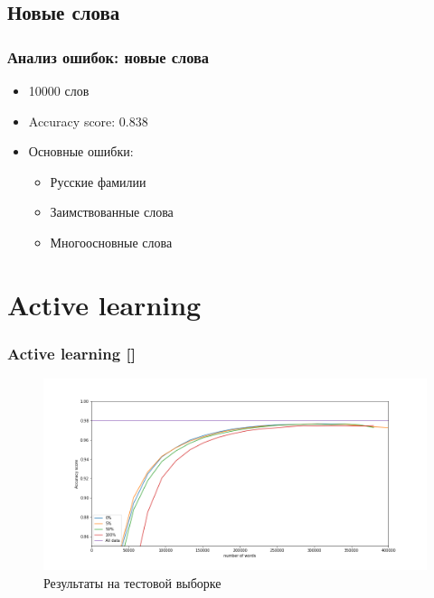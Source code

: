 \documentclass[russian]{beamer}
\begin{document}
\subsection{Новые слова}
\begin{frame}
\frametitle{Анализ ошибок: новые слова}
\begin{itemize}
	\item 10000 слов
	\item Accuracy score: 0.838
	\item Основные ошибки:
	\begin{itemize}
		\item Русские фамилии
		\item Заимствованные слова
		\item Многоосновные слова
	\end{itemize}
\end{itemize}
\end{frame}

\section{Active learning}
\begin{frame}
\frametitle{Active learning []}
\begin{figure}[H]
	\caption{Результаты на тестовой выборке}
	\begin{center}
		\includegraphics[width=1\linewidth]{All_scores}
	\end{center}
\end{figure}

\end{frame}
\end{document}
